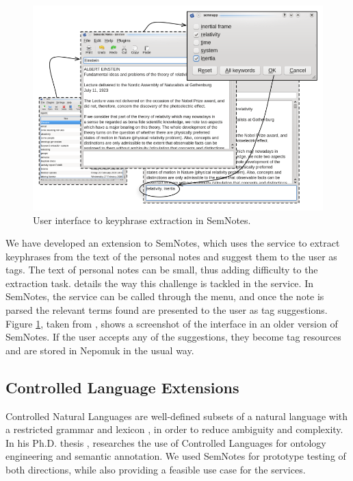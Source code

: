 \begin{figure}[tb]
 \centering
 \includegraphics[width=\linewidth]{chapters/core/img/keywordextraction}
 \caption{User interface to keyphrase extraction in SemNotes.}
 \label{fig:keywordextraction}
\end{figure}

We have developed an extension to SemNotes, which uses the service to extract keyphrases from the text of the personal notes and suggest them to the user as tags. The text of personal notes can be small, thus adding difficulty to the extraction task. \cite{Schutz2008} details the way this challenge is tackled in the service. In SemNotes, the service can be called through the menu, and once the note is parsed the relevant terms found are presented to the user as tag suggestions. Figure \ref{fig:keywordextraction}, taken from \cite{Schutz2008}, shows a screenshot of the interface in an older version of SemNotes. If the user accepts any of the suggestions, they become tag resources and are stored in Nepomuk in the usual way.

\subsection{Controlled Language Extensions}

Controlled Natural Languages are well-defined subsets of a natural language with a restricted grammar and lexicon \cite{Schwitter2005}, in order to reduce ambiguity and complexity. In his Ph.D. thesis \cite{Davis2012PhD}, researches the use of Controlled Languages for ontology engineering and semantic annotation. We used SemNotes for prototype testing of both directions, while also providing a feasible use case for the services.

